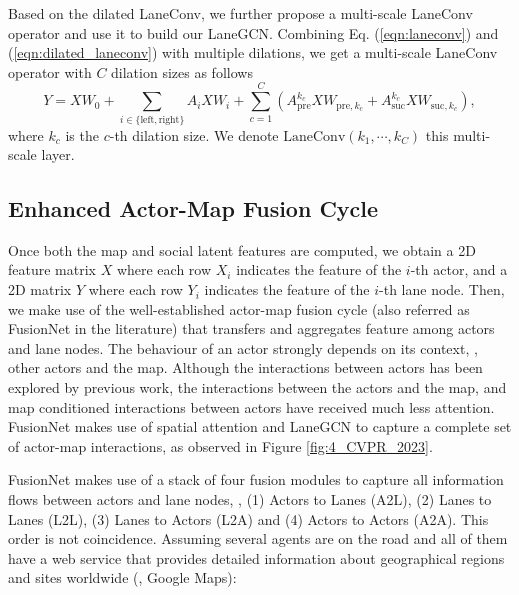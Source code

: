 Based on the dilated LaneConv, we further propose a multi-scale LaneConv operator and use it to build our LaneGCN.
Combining Eq. (\ref{eqn:laneconv}) and (\ref{eqn:dilated_laneconv}) with multiple dilations, we get a multi-scale LaneConv operator with $C$ dilation sizes as follows
\begin{equation}\label{eqn:dilated_laneconv_final}
	Y = XW_0 + \sum_{i \in \{ \text{left}, \text{right} \}} {A_{i} X W_{i}}
	+ \sum_{c=1}^{C} {\left( A_{\text{pre}}^{k_{c}} X W_{\text{pre},k_{c}} + A_{\text{suc}}^{k_{c}} X W_{\text{suc},k_{c}} \right)},
\end{equation}
where $k_c$ is the $c$-th dilation size. We denote  $\text{LaneConv}(k_1, \cdots, k_C)$ this multi-scale layer. 

\subsection{Enhanced Actor-Map Fusion Cycle}
\label{subsubsec:4_improving_efficiency_enhanced_fusion_cycle}

Once both the map and social latent features are computed, we obtain a 2D feature matrix $X$ where each row $X_i$ indicates the feature of the $i$-th actor, and a 2D matrix $Y$ where each row $Y_i$ indicates the feature of the $i$-th lane node. Then, we make use of the well-established actor-map fusion cycle \cite{liang2020learning} (also referred as FusionNet in the literature) that transfers and aggregates feature among actors and lane nodes. The behaviour of an actor strongly depends on its context, \ie, other actors and the map. Although the interactions between actors has been explored by previous work, the interactions between the actors and the map, and map conditioned interactions between actors have received much less attention. FusionNet makes use of spatial attention and LaneGCN to capture a complete set of actor-map interactions, as observed in Figure \ref{fig:4_CVPR_2023}.

FusionNet makes use of a stack of four fusion modules to capture all information flows between actors and lane nodes, \ie, (1) Actors to Lanes (A2L), (2) Lanes to Lanes (L2L), (3) Lanes to Actors (L2A) and (4) Actors to Actors (A2A). This order is not coincidence. Assuming several agents are on the road and all of them have a web service that provides detailed information about geographical regions and sites worldwide (\eg, Google Maps):

